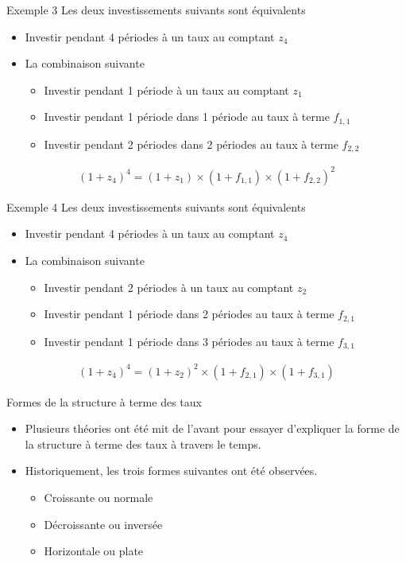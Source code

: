 \documentclass{beamer}
\begin{document}
\begin{frame}{Exemple 3}
Les deux investissements suivants sont équivalents
\begin{itemize}
\item Investir pendant 4 périodes à un taux au comptant $z_4$
\item La combinaison suivante
\begin{itemize}
\item Investir pendant 1 période à un taux au comptant $z_1$
\item Investir pendant 1 période dans 1 période au taux à terme $f_{1,1}$
\item Investir pendant 2 périodes dans 2 périodes au taux à terme $f_{2,2}$
\end{itemize}
\end{itemize}
\begin{align*}
(1+z_4)^4=(1+z_1) \times (1+f_{1,1}) \times (1+f_{2,2})^2
\end{align*}
\end{frame}

\begin{frame}{Exemple 4}
Les deux investissements suivants sont équivalents
\begin{itemize}
\item Investir pendant 4 périodes à un taux au comptant $z_4$
\item La combinaison suivante
\begin{itemize}
\item Investir pendant 2 périodes à un taux au comptant $z_2$
\item Investir pendant 1 période dans 2 périodes au taux à terme $f_{2,1}$
\item Investir pendant 1 période dans 3 périodes au taux à terme $f_{3,1}$
\end{itemize}
\end{itemize}
\begin{align*}
(1+z_4)^4=(1+z_2)^2 \times (1+f_{2,1}) \times (1+f_{3,1})
\end{align*}
\end{frame}


\begin{frame}{Formes de la structure à terme des taux}
\begin{itemize}
\item Plusieurs théories ont été mit de l'avant pour essayer d'expliquer la forme de la structure à terme des taux à travers le temps. 
\item Historiquement,  les trois formes suivantes ont été observées.
\begin{itemize}
\item Croissante ou normale
\item Décroissante ou inversée
\item Horizontale ou plate
\end{itemize}
\end{itemize}
\end{frame}
\end{document}
